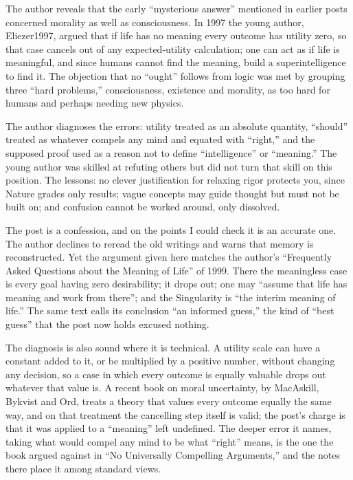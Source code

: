 \begin{afterword}
\summaryhead

The author reveals that the early ``mysterious answer'' mentioned in earlier posts concerned morality as well as consciousness. In 1997 the young author, Eliezer1997, argued that if life has no meaning every outcome has utility zero, so that case cancels out of any expected-utility calculation; one can act as if life is meaningful, and since humans cannot find the meaning, build a superintelligence to find it. The objection that no ``ought'' follows from logic was met by grouping three ``hard problems,'' consciousness, existence and morality, as too hard for humans and perhaps needing new physics.

The author diagnoses the errors: utility treated as an absolute quantity, ``should'' treated as whatever compels any mind and equated with ``right,'' and the supposed proof used as a reason not to define ``intelligence'' or ``meaning.'' The young author was skilled at refuting others but did not turn that skill on this position. The lessons: no clever justification for relaxing rigor protects you, since Nature grades only results; vague concepts may guide thought but must not be built on; and confusion cannot be worked around, only dissolved.

\responsehead

The post is a confession, and on the points I could check it is an accurate one. The author declines to reread the old writings and warns that memory is reconstructed. Yet the argument given here matches the author's ``Frequently Asked Questions about the Meaning of Life'' of 1999. There the meaningless case is every goal having zero desirability; it drops out; one may ``assume that life has meaning and work from there''; and the Singularity is ``the interim meaning of life.'' The same text calls its conclusion ``an informed guess,'' the kind of ``best guess'' that the post now holds excused nothing.

The diagnosis is also sound where it is technical. A utility scale can have a constant added to it, or be multiplied by a positive number, without changing any decision, so a case in which every outcome is equally valuable drops out whatever that value is. A recent book on moral uncertainty, by MacAskill, Bykvist and Ord, treats a theory that values every outcome equally the same way, and on that treatment the cancelling step itself is valid; the post's charge is that it was applied to a ``meaning'' left undefined. The deeper error it names, taking what would compel any mind to be what ``right'' means, is the one the book argued against in ``No Universally Compelling Arguments,'' and the notes there place it among standard views.


\end{afterword}
